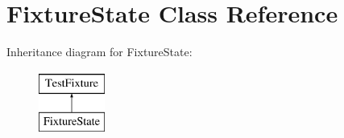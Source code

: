 \hypertarget{classFixtureState}{\section{Fixture\-State Class Reference}
\label{classFixtureState}
}
Inheritance diagram for Fixture\-State\-:\begin{figure}[H]
\begin{center}
\leavevmode
\includegraphics[height=2.000000cm]{classFixtureState}
\end{center}
\end{figure}

